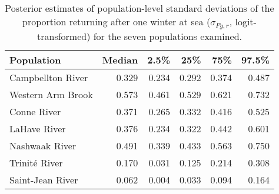 \begin{table}[ht]
\centering
\caption{Posterior estimates of population-level
                    standard deviations of the proportion returning 
                    after one winter at sea 
                    ($\sigma_{Pg,r}$, logit-transformed) for the seven populations examined.} 
\label{tab:prsigma}
\begin{tabular}{lrrrrr}
  \hline
Population & Median & 2.5\% & 25\% & 75\% & 97.5\% \\ 
  \hline
Campbellton River & 0.329 & 0.234 & 0.292 & 0.374 & 0.487 \\ 
  Western Arm Brook & 0.573 & 0.461 & 0.529 & 0.621 & 0.732 \\ 
  Conne River & 0.371 & 0.265 & 0.332 & 0.416 & 0.525 \\ 
  LaHave River & 0.376 & 0.234 & 0.322 & 0.442 & 0.601 \\ 
  Nashwaak River & 0.491 & 0.339 & 0.433 & 0.563 & 0.750 \\ 
  Trinité River & 0.170 & 0.031 & 0.125 & 0.214 & 0.308 \\ 
  Saint-Jean River & 0.062 & 0.004 & 0.033 & 0.094 & 0.164 \\ 
   \hline
\end{tabular}
\end{table}
